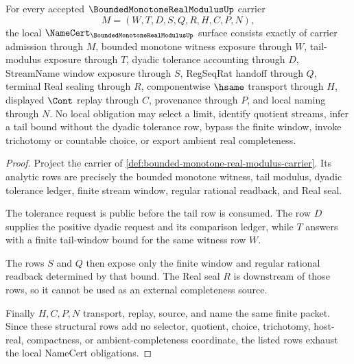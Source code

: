 \begin{theorem}
\label{thm:bounded-monotone-real-modulus-namecert-obligations}
For every accepted $\BoundedMonotoneRealModulusUp$ carrier
$$
M=(W,T,D,S,Q,R,H,C,P,N),
$$
the local $\NameCert_{\BoundedMonotoneRealModulusUp}$ surface consists exactly of carrier admission through $M$, bounded monotone witness exposure through $W$, tail-modulus exposure through $T$, dyadic tolerance accounting through $D$, StreamName window exposure through $S$, RegSeqRat handoff through $Q$, terminal Real sealing through $R$, componentwise $\hsame$ transport through $H$, displayed $\Cont$ replay through $C$, provenance through $P$, and local naming through $N$. No local obligation may select a limit, identify quotient streams, infer a tail bound without the dyadic tolerance row, bypass the finite window, invoke trichotomy or countable choice, or export ambient real completeness.
\end{theorem}
\begin{proof}
Project the carrier of \autoref{def:bounded-monotone-real-modulus-carrier}. Its analytic rows are precisely the bounded monotone witness, tail modulus, dyadic tolerance ledger, finite stream window, regular rational readback, and Real seal.

The tolerance request is public before the tail row is consumed. The row $D$ supplies the positive dyadic request and its comparison ledger, while $T$ answers with a finite tail-window bound for the same witness row $W$.

The rows $S$ and $Q$ then expose only the finite window and regular rational readback determined by that bound. The Real seal $R$ is downstream of those rows, so it cannot be used as an external completeness source.

Finally $H,C,P,N$ transport, replay, source, and name the same finite packet. Since these structural rows add no selector, quotient, choice, trichotomy, host-real, compactness, or ambient-completeness coordinate, the listed rows exhaust the local NameCert obligations.
\end{proof}

